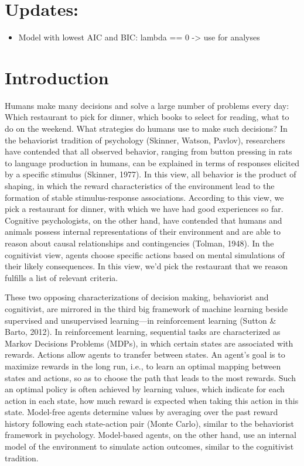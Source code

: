 \documentclass[11pt]{article} %
\begin{document}
\section{Updates:}
\begin{itemize}
	\item Model with lowest AIC and BIC: lambda == 0 -> use for analyses
\end{itemize}

\section{Introduction}

Humans make many decisions and solve a large number of problems every day: Which restaurant to pick for dinner, which books to select for reading, what to do on the weekend. What strategies do humans use to make such decisions? In the behaviorist tradition of psychology (Skinner, Watson, Pavlov), researchers have contended that all observed behavior, ranging from button pressing in rats to language production in humans, can be explained in terms of responses elicited by a specific stimulus (Skinner, 1977). In this view, all behavior is the product of shaping, in which the reward characteristics of the environment lead to the formation of stable stimulus-response associations. According to this view, we pick a restaurant for dinner, with which we have had good experiences so far. Cognitive psychologists, on the other hand, have contended that humans and animals possess internal representations of their environment and are able to reason about causal relationships and contingencies (Tolman, 1948). In the cognitivist view, agents choose specific actions based on mental simulations of their likely consequences. In this view, we'd pick the restaurant that we reason fulfills a list of relevant criteria.

These two opposing characterizations of decision making, behaviorist and cognitivist, are mirrored in the third big framework of machine learning beside supervised and unsupervised learning---in reinforcement learning (Sutton \& Barto, 2012). In reinforcement learning, sequential tasks are characterized as Markov Decisions Problems (MDPs), in which certain states are associated with rewards. Actions allow agents to transfer between states. An agent's goal is to maximize rewards in the long run, i.e., to learn an optimal mapping between states and actions, so as to choose the path that leads to the most rewards. Such an optimal policy is often achieved by learning values, which indicate for each action in each state, how much reward is expected when taking this action in this state. Model-free agents determine values by averaging over the past reward history following each state-action pair (Monte Carlo), similar to the behaviorist framework in psychology. Model-based agents, on the other hand, use an internal model of the environment to simulate action outcomes, similar to the cognitivist tradition.
\end{document}
